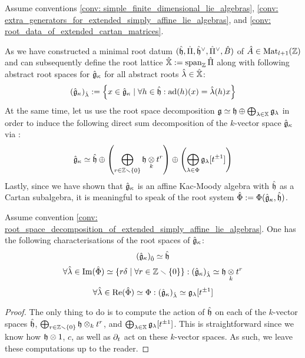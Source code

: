             \begin{convention} \label{conv: root_space_decomposition_of_extended_simply_affine_lie_algebras}
                Assume conventions \ref{conv: simple_finite_dimensional_lie_algebras}, \ref{conv: extra_generators_for_extended_simply_affine_lie_algebras}, and \ref{conv: root_data_of_extended_cartan_matrices}. 
                
                As we have constructed a minimal root datum $(\hat{\mathfrak{h}}, \hat{\Pi}, \hat{\mathfrak{h}}^{\vee}, \hat{\Pi}^{\vee}, \hat{B})$ of $\hat{A} \in \mathrm{Mat}_{l + 1}(\mathbb{Z})$ and can subsequently define the root lattice $\hat{\mathbb{X}} := \operatorname{span}_{\mathbb{Z}} \hat{\Pi}$ along with following abstract root spaces for $\hat{\mathfrak{g}}_{\kappa}$ for all abstract roots $\hat{\lambda} \in \hat{\mathbb{X}}$:
                    $$(\hat{\mathfrak{g}}_{\kappa})_{\hat{\lambda}} := \left\{ x \in \hat{\mathfrak{g}}_{\kappa} \mid \forall h \in \hat{\mathfrak{h}}: \mathrm{ad}(h)(x) = \hat{\lambda}(h)x \right\}$$
                At the same time, let us use the root space decomposition $\mathfrak{g} \simeq \mathfrak{h} \oplus \bigoplus_{\lambda \in \mathbb{X}} \mathfrak{g}_{\lambda}$ in order to induce the following direct sum decomposition of the $k$-vector space $\hat{\mathfrak{g}}_{\kappa}$ via :
                    $$\hat{\g}_{\kappa} \cong \hat{\h} \oplus \left(\bigoplus_{r \in \Z \setminus \{0\}} \h \tensor_k t^r\right) \oplus \left(\bigoplus_{\lambda \in \Phi} \g_{\lambda}[t^{\pm 1}]\right)$$
                Lastly, since we have shown that $\hat{\mathfrak{g}}_{\kappa}$ is an affine Kac-Moody algebra with $\hat{\mathfrak{h}}$ as a Cartan subalgebra, it is meaningful to speak of the root system $\hat{\Phi} := \Phi(\hat{\mathfrak{g}}_{\kappa}, \hat{\mathfrak{h}})$.
            \end{convention}
            \begin{lemma} \label{lemma: root_spaces_of_untwisted_affine_kac_moody_algebras}
                \cite[Proposition 12.2.14]{perrin_kac_moody_algebras} Assume convention \ref{conv: root_space_decomposition_of_extended_simply_affine_lie_algebras}. One has the following characterisations of the root spaces of $\hat{\mathfrak{g}}_{\kappa}$:
                    $$(\hat{\mathfrak{g}}_{\kappa})_{\hat{0}} \simeq \hat{\mathfrak{h}}$$
                    $$\forall \hat{\lambda} \in \Im( \hat{\Phi} ) \cong \{r \delta \mid \forall r \in \Z \setminus \{0\}\}: (\hat{\g}_{\kappa})_{\hat{\lambda}} \cong \h \tensor_k t^r$$
                    $$\forall \hat{\lambda} \in \operatorname{Re}( \hat{\Phi} ) \simeq \Phi: (\hat{\mathfrak{g}}_{\kappa})_{\hat{\lambda}} \simeq \mathfrak{g}_{\lambda}[t^{\pm 1}]$$
            \end{lemma}
                \begin{proof}
                    The only thing to do is to compute the action of $\hat{\mathfrak{h}}$ on each of the $k$-vector spaces $\hat{\mathfrak{h}}$, $\bigoplus_{r \in \Z \setminus \{0\}} \h \tensor_k t^r$, and $\bigoplus_{\lambda \in \mathbb{X}} \mathfrak{g}_{\lambda}[t^{\pm 1}]$. This is straightforward since we know how $\h \tensor 1$, $c$, as well as $\partial_t$ act on these $k$-vector spaces. As such, we leave these computations up to the reader. 
                \end{proof}  

